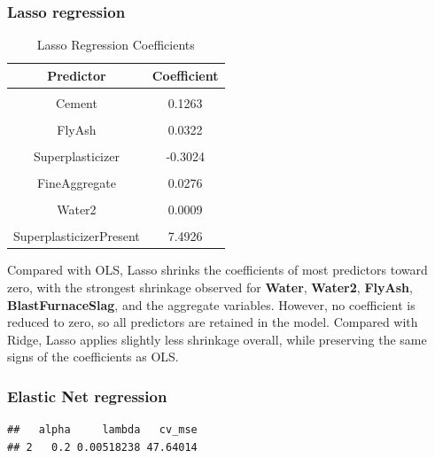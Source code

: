 \documentclass[
  11pt,
]{article}
\begin{document}
\subsubsection{Lasso regression}\label{lasso-regression}

\begin{table}[!h]
\centering
\caption{\label{tab:lasso}Lasso Regression Coefficients}
\centering
\fontsize{10}{12}\selectfont
\begin{tabular}[t]{cc}
\toprule
\textbf{Predictor} & \textbf{Coefficient}\\
\midrule
\cellcolor{gray!10}{(Intercept)} & \cellcolor{gray!10}{-25.0561}\\
Cement & 0.1263\\
\cellcolor{gray!10}{BlastFurnaceSlag} & \cellcolor{gray!10}{0.1061}\\
FlyAsh & 0.0322\\
\cellcolor{gray!10}{Water} & \cellcolor{gray!10}{-0.5024}\\
\addlinespace
Superplasticizer & -0.3024\\
\cellcolor{gray!10}{CoarseAggregate} & \cellcolor{gray!10}{0.0233}\\
FineAggregate & 0.0276\\
\cellcolor{gray!10}{LogAge} & \cellcolor{gray!10}{8.6299}\\
Water2 & 0.0009\\
\addlinespace
\cellcolor{gray!10}{FlyAshPresent} & \cellcolor{gray!10}{3.6165}\\
SuperplasticizerPresent & 7.4926\\
\bottomrule
\end{tabular}
\end{table}

Compared with OLS, Lasso shrinks the coefficients of most predictors
toward zero, with the strongest shrinkage observed for \textbf{Water},
\textbf{Water2}, \textbf{FlyAsh}, \textbf{BlastFurnaceSlag}, and the
aggregate variables. However, no coefficient is reduced to zero, so all
predictors are retained in the model. Compared with Ridge, Lasso applies
slightly less shrinkage overall, while preserving the same signs of the
coefficients as OLS.

\subsubsection{Elastic Net regression}\label{elastic-net-regression}

\begin{verbatim}
##   alpha     lambda   cv_mse
## 2   0.2 0.00518238 47.64014
\end{verbatim}
\end{document}
